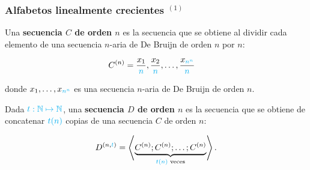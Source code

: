 \documentclass[t, 10pt, mathserif]{beamer}
\begin{document}
\begin{frame}
  \frametitle{Alfabetos linealmente crecientes {$^{(1)}$}}

  \vspace{-0.5cm}
  \begin{definition}
    \medskip
    Una \textbf{secuencia $C$ de orden $n$} es la secuencia que se obtiene al dividir cada elemento de una secuencia {\color{cyan} $n$-aria} de De Bruijn de orden $n$ por {\color{cyan} $n$}:

    \begin{equation*}
      \begin{aligned}
        C^{(n)} & = \frac{x_1}{{\color{cyan} n}}, \frac{x_2}{{\color{cyan} n}}, \dots, \frac{x_{{\color{cyan} n^n}}}{{\color{cyan} n}}
      \end{aligned}
    \end{equation*}

    \medskip
    donde $x_1, \dots, x_{{\color{cyan} n^n}}$ es una secuencia {\color{cyan} $n$-aria} de De Bruijn de orden $n$.
  \end{definition}

  \begin{definition}
    \medskip
    Dada ${\color{cyan} t : \mathbb{N} \mapsto \mathbb{N}}$, una \textbf{secuencia $D$ de orden $n$} es la secuencia que se obtiene de concatenar ${\color{cyan} t(n)}$ copias de una secuencia $C$ de orden $n$:

    \begin{equation*}
      D^{(n, {\color{cyan} t})} = \left< \underbrace{C^{(n)} ; C^{(n)} ; \dots ; C^{(n)}}_{{\color{cyan} t(n)} \text{ veces}} \right> \text{.}
    \end{equation*}
  \end{definition}
\end{frame}

\end{document}
